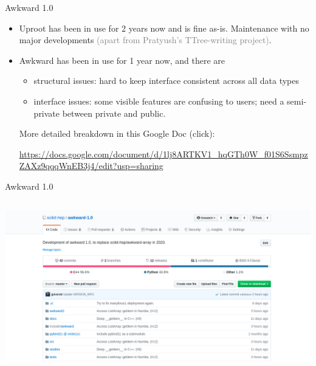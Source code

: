 \documentclass[aspectratio=169]{beamer}
\begin{document}
\begin{frame}{Awkward 1.0}
\large
\vspace{0.5 cm}
\begin{itemize}\setlength{\itemsep}{0.75 cm}
\item Uproot has been in use for 2 years now and is fine as-is. Maintenance with no major developments \textcolor{gray}{(apart from Pratyush's TTree-writing project)}.

\item Awkward has been in use for 1 year now, and there are

\vspace{0.2 cm}
\begin{itemize}\setlength{\itemsep}{0.2 cm}
\item \large structural issues: hard to keep interface consistent across all data types
\item \large interface issues: some visible features are confusing to users; need a semi-private between private and public.
\end{itemize}

\vspace{0.2 cm}
More detailed breakdown in this Google Doc (click): \normalsize

\vspace{0.2 cm}
\textcolor{blue}{\url{https://docs.google.com/document/d/1lj8ARTKV1_hqGTh0W_f01S6SsmpzZAXz9qqqWnEB3j4/edit?usp=sharing}}
\end{itemize}
\end{frame}

\begin{frame}{Awkward 1.0}
\vspace{0.2 cm}
\begin{columns}
\includegraphics[width=\linewidth]{awkward-1-github.png}
\end{columns}
\end{frame}
\end{document}
